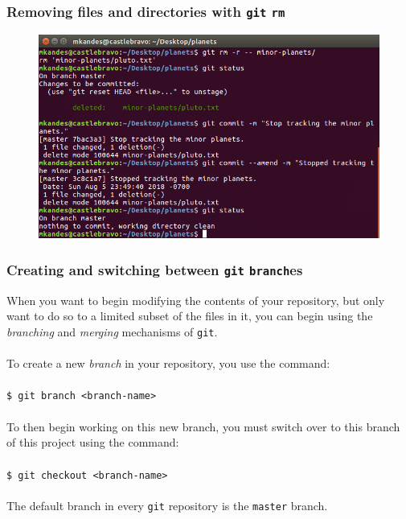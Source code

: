 \documentclass{beamer}
\begin{document}
\begin{frame}
   \frametitle{Removing files and directories with \texttt{git} \texttt{rm}}
   \begin{figure}[htbp]
      \includegraphics[width=1.0\textwidth]{images/git-rm.png}
   \end{figure}
\end{frame}

\begin{frame}
   \frametitle{Creating and switching between \texttt{git} \texttt{branch}es}
   When you want to begin modifying the contents of your repository, 
   but only want to do so to a limited subset of the files in it, you 
   can begin using the \textit{branching} and \textit{merging} 
   mechanisms of \texttt{git}.
   \\ \ \\
   To create a new \textit{branch} in your repository, you use the command:
   \\ \ \\
   \texttt{\hspace{1.0em}\$ git branch <branch-name>}
   \\ \ \\
   To then begin working on this new branch, you must switch over to this branch of this project using the command:
   \\ \ \\
   \texttt{\hspace{1.0em}\$ git checkout <branch-name>}
   \\ \ \\
   The default branch in every \texttt{git} repository is the 
   \texttt{master} branch.
\end{frame}
 
\end{document}
